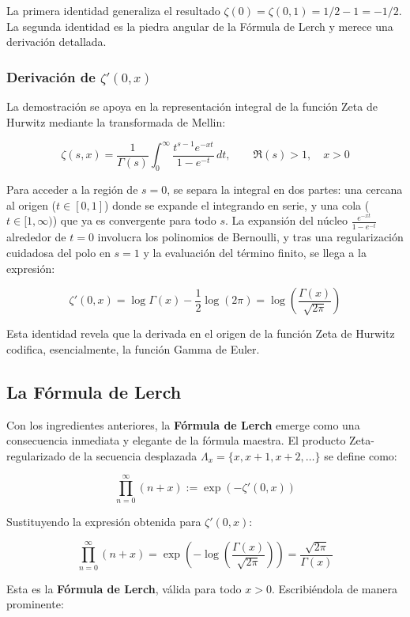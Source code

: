 La primera identidad generaliza el resultado $\zeta(0) = \zeta(0, 1) = 1/2 - 1 = -1/2$. La segunda identidad es la piedra angular de la Fórmula de Lerch y merece una derivación detallada.

\subsubsection{Derivación de $\zeta'(0, x)$}

La demostración se apoya en la representación integral de la función Zeta de Hurwitz mediante la transformada de Mellin:

$$ \zeta(s, x) = \frac{1}{\Gamma(s)} \int_0^{\infty} \frac{t^{s-1} e^{-xt}}{1 - e^{-t}} \, dt, \qquad \Re(s) > 1, \quad x > 0 $$

Para acceder a la región de $s=0$, se separa la integral en dos partes: una cercana al origen ($t \in [0, 1]$) donde se expande el integrando en serie, y una cola ($t \in [1, \infty)$) que ya es convergente para todo $s$. La expansión del núcleo $\frac{e^{-xt}}{1-e^{-t}}$ alrededor de $t=0$ involucra los polinomios de Bernoulli, y tras una regularización cuidadosa del polo en $s=1$ y la evaluación del término finito, se llega a la expresión:

$$ \zeta'(0, x) = \log\Gamma(x) - \frac{1}{2}\log(2\pi) = \log\left(\frac{\Gamma(x)}{\sqrt{2\pi}}\right) $$

Esta identidad revela que la derivada en el origen de la función Zeta de Hurwitz codifica, esencialmente, la función Gamma de Euler.

\subsection{La Fórmula de Lerch}

Con los ingredientes anteriores, la \textbf{Fórmula de Lerch} emerge como una consecuencia inmediata y elegante de la fórmula maestra. El producto Zeta-regularizado de la secuencia desplazada $\Lambda_x = \{x, x+1, x+2, \dots\}$ se define como:

$$ \prod_{n=0}^{\infty} (n+x) := \exp(-\zeta'(0, x)) $$

Sustituyendo la expresión obtenida para $\zeta'(0, x)$:

$$ \prod_{n=0}^{\infty} (n+x) = \exp\left(-\log\left(\frac{\Gamma(x)}{\sqrt{2\pi}}\right)\right) = \frac{\sqrt{2\pi}}{\Gamma(x)} $$

Esta es la \textbf{Fórmula de Lerch}, válida para todo $x > 0$. Escribiéndola de manera prominente:

